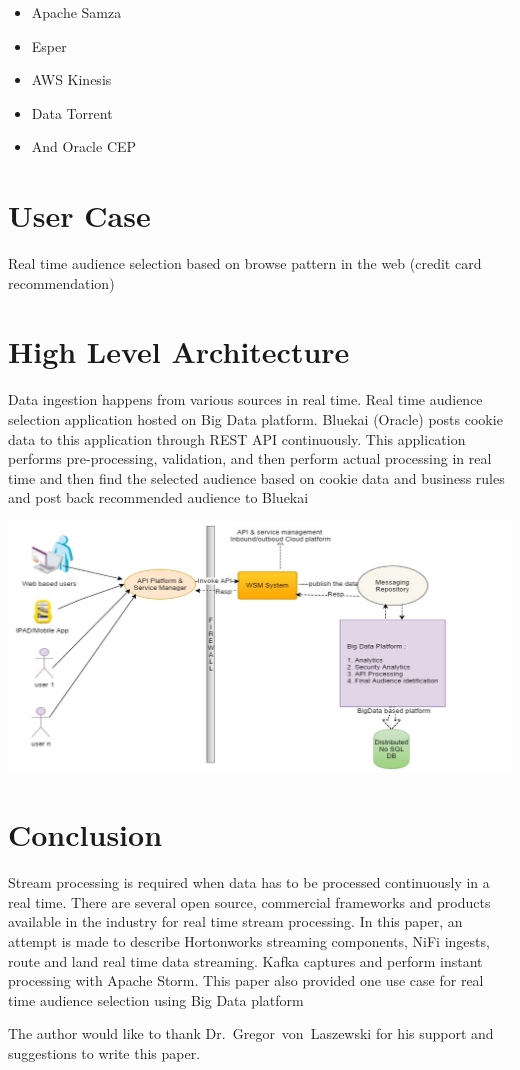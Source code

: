 \begin{itemize}
\item Apache Samza
\item Esper 
\item AWS Kinesis 
\item Data Torrent 
\item And Oracle CEP 
\end{itemize}


\section{User Case}
Real time audience selection based on browse pattern in the web (credit card recommendation)

\section{High Level Architecture}
Data ingestion happens from various sources in real time. Real time audience selection application hosted on Big Data platform.
Bluekai (Oracle) posts cookie data to this application through REST API continuously. This application performs pre-processing, 
validation, and then perform actual processing in real time and then find the selected 
audience based on cookie data and business rules and post back recommended audience to Bluekai

\centering\includegraphics[width=\columnwidth]{images/realTimeAudienceSelection.JPG}

 
\section{Conclusion}
Stream processing is required when data has to be processed continuously in a real time. There are several open source, 
commercial frameworks and products available in the industry for real time stream processing. In this paper, an attempt is made 
to describe Hortonworks streaming components, NiFi ingests, route and land real time data streaming. Kafka captures and perform instant 
processing with Apache Storm. This paper also provided one use case for real time audience selection using Big Data platform

\begin{acks}

  The author would like to thank Dr.~Gregor~von~Laszewski for his
  support and suggestions to write this paper.

\end{acks}


 